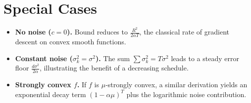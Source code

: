 \documentclass{article}
\begin{document}
\section*{Special Cases}
\begin{itemize}
\item \textbf{No noise ($c=0$).}  Bound reduces to $\frac{R^{2}}{2\alpha T}$, the classical rate of gradient descent on convex smooth functions.
\item \textbf{Constant noise ($\sigma_{k}^{2}=\sigma^{2}$).}  The sum $\sum\sigma_{k}^{2}=T\sigma^{2}$ leads to a steady error floor $\frac{d\sigma^{2}}{2\alpha}$, illustrating the benefit of a decreasing schedule.
\item \textbf{Strongly convex $f$.}  If $f$ is $\mu$‑strongly convex, a similar derivation yields an exponential decay term $ (1-\alpha\mu)^{T}$ plus the logarithmic noise contribution.
\end{itemize}
\end{document}

